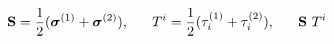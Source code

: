\begin{equation}
{\bf S} =\frac{1}{2}(\mbox{\boldmath $\sigma$}^{(1)}+ 
\mbox{\boldmath $\sigma$}^{(2)}),~~~~~ T^{i} =
\frac{1}{2}(\tau_{i}^{(1)} + \tau_{i}^{(2)}),~~~~~ {\bf S}~T^{i} 
\end{equation}


